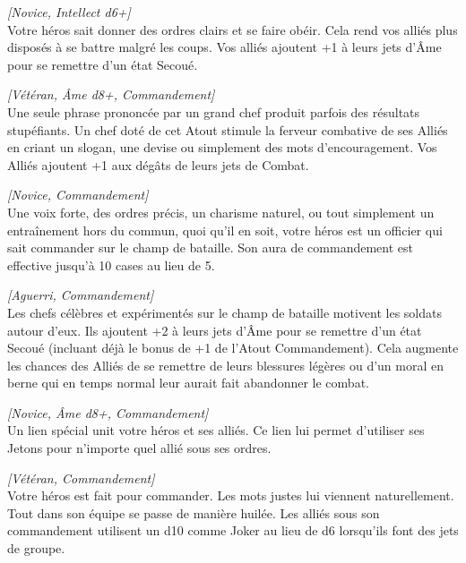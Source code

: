\begin{description}[align=left]
    \item [Commandement]
    	\emph{[Novice, Intellect d6+]}\\
        Votre héros sait donner des ordres clairs et se faire obéir. Cela rend vos alliés plus disposés à se battre malgré les coups. Vos alliés ajoutent +1 à leurs jets d’\^Ame pour se remettre d’un état Secoué.

    \item [Ferveur]
    	\emph{[Vétéran, Âme d8+, Commandement]}\\
        Une seule phrase prononcée par un grand chef produit parfois des résultats stupéfiants. Un chef doté de cet Atout stimule la ferveur combative de ses Alliés en criant un slogan, une devise ou simplement des mots d’encouragement. Vos Alliés ajoutent +1 aux dégâts de leurs jets de Combat.

    \item [Grande aura de commandement]
    	\emph{[Novice, Commandement]}\\
        Une voix forte, des ordres précis, un charisme naturel, ou tout simplement un entraînement hors du commun, quoi qu’il en soit, votre héros est un officier qui sait commander sur le champ de bataille. Son aura de commandement est effective jusqu’à 10 cases au lieu de 5.

    \item [Inspiration]
    	\emph{[Aguerri, Commandement]}\\
        Les chefs célèbres et expérimentés sur le champ de bataille motivent les soldats autour d’eux. Ils ajoutent +2 à leurs jets d’\^Ame pour se remettre d’un état Secoué (incluant déjà le bonus de +1 de l’Atout Commandement). Cela augmente les chances des Alliés de se remettre de leurs blessures légères ou d’un moral en berne qui en temps normal leur aurait fait abandonner le combat.

    \item [Leader naturel]
    	\emph{[Novice, Âme d8+, Commandement]}\\
        Un lien spécial unit votre héros et ses alliés. Ce lien lui permet d’utiliser ses Jetons pour n’importe quel allié sous ses ordres.

    \item [Meneur d’hommes]
    	\emph{[Vétéran, Commandement]}\\
        Votre héros est fait pour commander. Les mots justes lui viennent naturellement. Tout dans son équipe se passe de manière huilée. Les alliés sous son commandement utilisent un d10 comme Joker au lieu de d6 lorsqu’ils font des jets de groupe.


\end{description}
